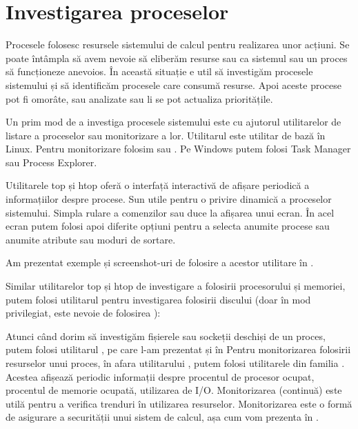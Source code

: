 \section{Investigarea proceselor}
\label{sec:process-investigare}

Procesele folosesc resursele sistemului de calcul pentru realizarea unor
acțiuni. Se poate întâmpla să avem nevoie să eliberăm resurse sau ca sistemul
sau un proces să funcționeze anevoios. În această situație e util să investigăm
procesele sistemului și să identificăm procesele care consumă resurse. Apoi
aceste procese pot fi omorâte, sau analizate sau li se pot actualiza
prioritățile.

Un prim mod de a investiga procesele sistemului este cu ajutorul utilitarelor de
listare a proceselor sau monitorizare a lor. Utilitarul  este utilitar de bază
în Linux. Pentru monitorizare folosim  sau . Pe Windows putem folosi Task
Manager sau Process Explorer.

Utilitarele top și htop oferă o interfață interactivă de afișare periodică a
informațiilor despre procese. Sun utile pentru o privire dinamică a proceselor
sistemului. Simpla rulare a comenzilor  sau  duce la afișarea unui ecran.
În acel ecran putem folosi apoi diferite opțiuni pentru a selecta anumite
procese sau anumite atribute sau moduri de sortare.

Am prezentat exemple și screenshot-uri de folosire a acestor utilitare în .

Similar utilitarelor top și htop de investigare a folosirii procesorului și
memoriei, putem folosi utilitarul  pentru investigarea folosirii discului (doar în mod privilegiat, este nevoie de folosirea ):


Atunci când dorim să investigăm fișierele sau sockeții deschiși de un proces,
putem folosi utilitarul , pe care l-am prezentat și în
 Pentru monitorizarea folosirii
resurselor unui proces, în afara utilitarului , putem folosi utilitarele din
familia . Acestea afișează periodic informații despre procentul de
procesor ocupat, procentul de memorie ocupată, utilizarea de I/O. Monitorizarea
(continuă) este utilă pentru a verifica trenduri în utilizarea resurselor.
Monitorizarea este o formă de asigurare a securității unui sistem de calcul, așa
cum vom prezenta în .


